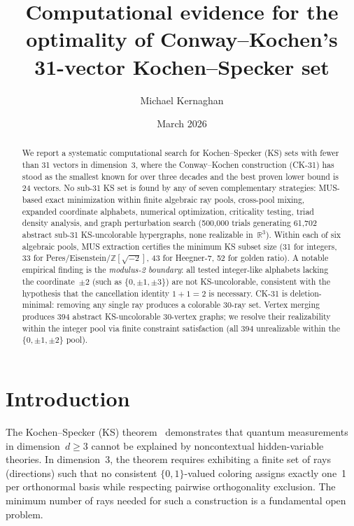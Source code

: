 \documentclass[twocolumn,prl,superscriptaddress,nofootinbib]{revtex4-2}
\newcommand{\R}{\mathbb{R}}
\newcommand{\Z}{\mathbb{Z}}
\begin{document}
\title{Computational evidence for the optimality of Conway--Kochen's\\31-vector Kochen--Specker set}

\author{Michael Kernaghan}

\date{March 2026}

\begin{abstract}
We report a systematic computational search for Kochen--Specker (KS) sets with fewer than 31 vectors in dimension~3, where the Conway--Kochen construction (CK-31) has stood as the smallest known for over three decades and the best proven lower bound is 24 vectors. No sub-31 KS set is found by any of seven complementary strategies: MUS-based exact minimization within finite algebraic ray pools, cross-pool mixing, expanded coordinate alphabets, numerical optimization, criticality testing, triad density analysis, and graph perturbation search (500{,}000 trials generating 61{,}702 abstract sub-31 KS-uncolorable hypergraphs, none realizable in~$\R^3$). Within each of six algebraic pools, MUS extraction certifies the minimum KS subset size (31 for integers, 33 for Peres/Eisenstein/$\Z[\sqrt{-2}]$, 43 for Heegner-7, 52 for golden ratio). A notable empirical finding is the \emph{modulus-2 boundary}: all tested integer-like alphabets lacking the coordinate~$\pm2$ (such as $\{0,\pm1,\pm3\}$) are not KS-uncolorable, consistent with the hypothesis that the cancellation identity $1+1=2$ is necessary. CK-31 is deletion-minimal: removing any single ray produces a colorable 30-ray set. Vertex merging produces 394 abstract KS-uncolorable 30-vertex graphs; we resolve their realizability within the integer pool via finite constraint satisfaction (all 394 unrealizable within the $\{0,\pm1,\pm2\}$ pool).
\end{abstract}

\maketitle

\section{Introduction}

The Kochen--Specker (KS) theorem~\cite{KochenSpecker1967} demonstrates that quantum measurements in dimension~$d \geq 3$ cannot be explained by noncontextual hidden-variable theories. In dimension~3, the theorem requires exhibiting a finite set of rays (directions) such that no consistent $\{0,1\}$-valued coloring assigns exactly one~1 per orthonormal basis while respecting pairwise orthogonality exclusion. The minimum number of rays needed for such a construction is a fundamental open problem.
\end{document}
